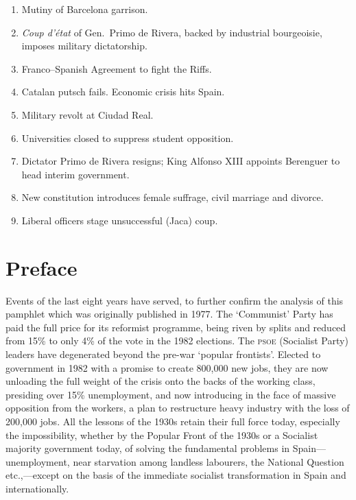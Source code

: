 \documentclass[
  12pt,
  pagesize,
  paper = 6in:9in,
  DIV = 12,
  openany
]{scrbook}
\newcommand{\ac}[1]{\textsc{\lowercase{#1}}}
\newcommand{\cdate}[1]{\item[#1]}
\newcommand{\cera}[1]{\medskip {\bfseries\sffamily\large #1} \smallskip}
\newenvironment{chronology}{
  \raggedright
  \begin{enumerate}
  \setlength{\itemsep}{0em}
}{
  \end{enumerate}
}
\begin{document}
\begin{chronology}
\cera{1923}

\cdate{September 12}
Mutiny of Barcelona garrison.

\cdate{September 23}
\emph{Coup d'\'etat} of Gen.~Primo de Rivera,
backed by industrial bourgeoisie,
imposes military dictatorship.

\cera{1925}

\cdate{July}
Franco--Spanish Agreement to fight the Riffs.

\cdate{November}
Catalan putsch fails.
Economic crisis hits Spain.

\cera{1929}

\cdate{January}
Military revolt at Ciudad Real.

\cdate{March}
Universities closed to suppress student opposition.

\cera{1930}

\cdate{January}
Dictator Primo de Rivera resigns;
King Alfonso XIII appoints Berenguer to head interim government.

\cdate{December 9}
New constitution introduces female suffrage, civil marriage and divorce.

\cdate{December 12}
Liberal officers stage unsuccessful (Jaca) coup.

\end{chronology}

\chapter{Preface}

Events of the last eight years have served, to further confirm the
analysis of this pamphlet which was originally published in 1977.
The `Communist' Party has paid the full price for its reformist programme,
being riven by splits and reduced from 15\% to only 4\% of
the vote in the 1982 elections. The \ac{PSOE} (Socialist Party) leaders
have degenerated beyond the pre-war ‘popular frontists'. Elected to
government in 1982 with a promise to create 800,000 new jobs, they
are now unloading the full weight of the crisis onto the backs of the
working class, presiding over 15\% unemployment, and now introducing
in the face of massive opposition from the workers, a plan to
restructure heavy industry with the loss of 200,000 jobs.
All the lessons of the 1930s retain their full force today, especially
the impossibility, whether by the Popular Front of the 1930s or a
Socialist majority government today, of solving the fundamental problems
in Spain---unemployment, near starvation among landless
labourers, the National Question etc.,---except on the basis of the immediate
socialist transformation in Spain and internationally.
\end{document}
